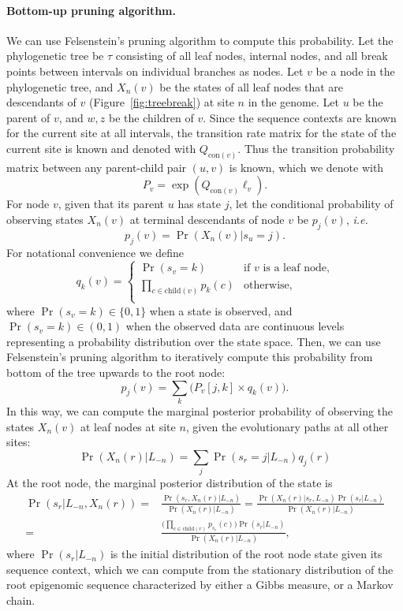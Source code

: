 \documentclass[11pt]{article}
\newcommand{\context}{\ensuremath{\mathrm{con}}}
\newcommand{\child}[1]{\ensuremath{\mathrm{child}(#1)}}
\begin{document}
\paragraph{Bottom-up pruning algorithm.}
We can use Felsenstein's pruning algorithm to compute this
probability.  Let the phylogenetic tree be $\tau$ consisting of all
leaf nodes, internal nodes, and all break points between intervals on
individual branches as nodes.  Let $v$ be a node in the phylogenetic
tree, and $X_n(v)$ be the states of all leaf nodes that are
descendants of $v$ (Figure~\ref{fig:treebreak}) at site $n$ in the
genome. Let $u$ be the parent of $v$, and $w, z$ be the children of
$v$. Since the sequence contexts are known for the current site at all
intervals, the transition rate matrix for the state of the current
site is known and denoted with $Q_{\context{}(v)}$. Thus the
transition probability matrix between any parent-child pair $(u,v)$ is
known, which we denote with
\[
P_v = \exp(Q_{\context{}(v)}\ell_v).
\] 
For node $v$, given that its parent $u$ has state $j$, let the
conditional probability of observing states $X_n(v)$ at
terminal descendants of node $v$ be $p_j(v)$, \textit{i.e.}
\[
p_j(v) = \Pr(X_n(v) | s_u=j).
\]
For notational convenience we define
\[
q_k(v) = \left\{
  \begin{array}{ll}
    \Pr(s_v = k) & \mbox{if $v$ is a leaf node,} \\
    \prod_{c\in \child{v}}  p_{k}(c) & \mbox{otherwise,} \\
  \end{array}\right.
\]
where $\Pr(s_v = k) \in \{0, 1\}$ when a state is observed, and
$\Pr(s_v = k) \in (0,1)$ when the observed data are continuous levels
representing a probability distribution over the state space. Then, we
can use Felsenstein's pruning algorithm to iteratively compute this probability
from bottom of the tree upwards to the root node:
\begin{equation}
  p_j(v) = \sum\limits_{k} \bigg(P_v[j,k] \times q_k(v)\bigg).
\end{equation}
In this way, we can compute the marginal posterior probability of observing the
states $X_n(v)$ at leaf nodes at site $n$, given the evolutionary
paths at all other sites:
\begin{equation}\label{eqn:leafmarginal}
\Pr(X_n(r) | L_{-n}) = \sum_j\Pr(s_r=j |L_{-n}) q_j(r)
\end{equation}
At the root node, the marginal posterior distribution of the state is 
\begin{equation} \label{eqn:rootposterior}
\begin{aligned}
\Pr(s_r| L_{-n}, X_n(r)) = & \frac{\Pr(s_r, X_n(r)|L_{-n})}{\Pr(X_n(r)| L_{-n})} = \frac{\Pr(X_n(r)|s_r, L_{-n}) \Pr(s_r|L_{-n})}{\Pr(X_n(r)| L_{-n}) }  \\
= & \frac{ \big(\prod_{c\in \child{r}}  p_{s_r}(c)\big) \Pr(s_r|L_{-n})}{\Pr(X_n(r)| L_{-n}) },
\end{aligned}
\end{equation}
where $\Pr(s_r|L_{-n})$ is the initial distribution of the root node
state given its sequence context, which we can compute from the
stationary distribution of the root epigenomic sequence characterized
by either a Gibbs measure, or a Markov chain.
\end{document}
